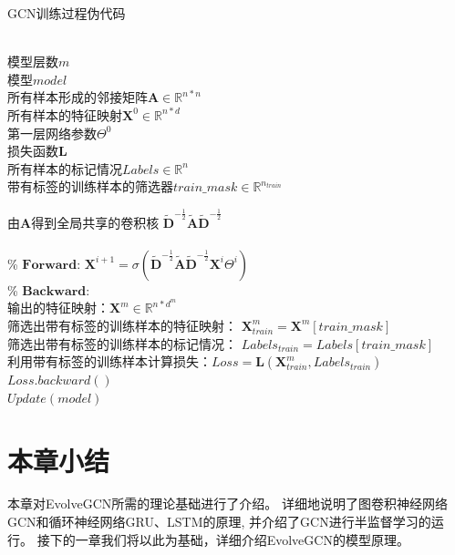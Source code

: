     \begin{algorithm}[htbp]
      \caption{GCN训练过程伪代码}
      \label{alg:GCN-process}
      \hspace*{0.04in}{\bf Inputs:}\\
      模型层数$m$\\
      模型$model$\\
      所有样本形成的邻接矩阵$\mathbf{A} \in \mathbb{R}^{n*n}$\\
      所有样本的特征映射$\mathbf{X}^{0} \in \mathbb{R}^{n*d}$\\
      第一层网络参数$\Theta^{0}$\\
      损失函数$\mathbf{L}$\\
      所有样本的标记情况$Labels \in \mathbb{R}^{n}$\\
      带有标签的训练样本的筛选器$train\_mask \in \mathbb{R}^{n_{train}}$ \\
      \begin{algorithmic}[1]
        \State 由$\mathbf{A}$得到全局共享的卷积核
        $\tilde{\mathbf{D}}^{-\frac{1}{2}} 
        \tilde{\mathbf{A}} 
        \tilde{\mathbf{D}}^{-\frac{1}{2}}$ \\
        \\
        \% $\textbf{Forward:} $
          \State 
          $\mathbf{X}^{i+1} = \sigma(
            \tilde{\mathbf{D}}^{-\frac{1}{2}} \tilde{\mathbf{A}} \tilde{\mathbf{D}}^{-\frac{1}{2}}
            \mathbf{X}^{i}\Theta^{i}
            )$
        \EndFor
        \\
        \State
        \% $\textbf{Backward:}$\\
        输出的特征映射：$\mathbf{X}^{m} \in \mathbb{R}^{n*{d^m}}$ \\
        筛选出带有标签的训练样本的特征映射： $\mathbf{X}^{m}_{train} = \mathbf{X}^{m}[train\_mask]$ \\
        筛选出带有标签的训练样本的标记情况： $Labels_{train} = Labels[train\_mask]$ \\ 
        利用带有标签的训练样本计算损失：$Loss = \mathbf{L}(\mathbf{X}^{m}_{train}, Labels_{train})$ \\

        $Loss.backward()$ \\
        $Update(model)$
      \end{algorithmic}
    \end{algorithm}

  \section{本章小结} \label{sec:B4}
  本章对EvolveGCN所需的理论基础进行了介绍。
  详细地说明了图卷积神经网络GCN和循环神经网络GRU、LSTM的原理,
  并介绍了GCN进行半监督学习的运行。
  接下的一章我们将以此为基础，详细介绍EvolveGCN的模型原理。

